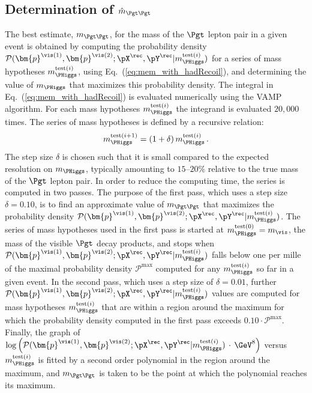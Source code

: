 \subsection{Determination of $\hat{m}_{\Pgt\Pgt}$}
\label{sec:mem_numericalMaximization}

The best estimate, $m_{\Pgt\Pgt}$, for the mass of the $\Pgt$ lepton pair in a given event
is obtained by computing the probability density $\mathcal{P}(\bm{p}^{\vis(1)},\bm{p}^{\vis(2)};\pX^{\rec},\pY^{\rec}|m_{\PHiggs}^{\textrm{test}(i)})$ 
for a series of mass hypotheses $m_{\PHiggs}^{\textrm{test}(i)}$, using Eq.~(\ref{eq:mem_with_hadRecoil}), and determining the value of $m_{\PHiggs}$ that maximizes this probability density.
The integral in Eq.~(\ref{eq:mem_with_hadRecoil}) is evaluated numerically using the VAMP algorithm.
For each mass hypotheses $m_{\PHiggs}^{\textrm{test}(i)}$ the integrand is evaluated $20,000$ times.
The series of mass hypotheses is defined by a recursive relation: 
\begin{equation}
m_{\PHiggs}^{\textrm{test}(i + 1)} = (1 + \delta) \,  m_{\PHiggs}^{\textrm{test}(i)} \, .
\label{eq:mTauTau_step_size}
\end{equation}
The step size $\delta$ is chosen such that it is small compared to the
expected resolution on $m_{\PHiggs}$,
typically amounting to $15$--$20\%$ relative to the true mass of the $\Pgt$ lepton pair.
In order to reduce the computing time, the series is computed in two passes.
The purpose of the first pass, which uses a step size $\delta = 0.10$, is to find an approximate value of $m_{\Pgt\Pgt}$
that maximizes the probability density $\mathcal{P}(\bm{p}^{\vis(1)},\bm{p}^{\vis(2)};\pX^{\rec},\pY^{\rec}|m_{\PHiggs}^{\textrm{test}(i)})$.
The series of mass hypotheses used in the first pass is started at $m_{\PHiggs}^{\textrm{test}(0)} = m_{\vis}$,
the mass of the visible $\Pgt$ decay products, 
and stops when $\mathcal{P}(\bm{p}^{\vis(1)},\bm{p}^{\vis(2)};\pX^{\rec},\pY^{\rec}|m_{\PHiggs}^{\textrm{test}(i)})$ falls below one per mille 
of the maximal probability density $\mathcal{P}^{\textrm{max}}$
computed for any $m_{\PHiggs}^{\textrm{test}(i)}$ so far in a given event.
In the second pass, which uses a step size of $\delta = 0.01$,
further $\mathcal{P}(\bm{p}^{\vis(1)},\bm{p}^{\vis(2)};\pX^{\rec},\pY^{\rec}|m_{\PHiggs}^{\textrm{test}(i)})$ values 
are computed for mass hypotheses $m_{\PHiggs}^{\textrm{test}(i)}$ that
are within a region around the maximum
for which the probability density computed in the first pass exceeds
$0.10 \cdot \mathcal{P}^{\textrm{max}}$.
Finally, the graph of $\log \left( \mathcal{P}(\bm{p}^{\vis(1)},\bm{p}^{\vis(2)};\pX^{\rec},\pY^{\rec}|m_{\PHiggs}^{\textrm{test}(i)}) \, \cdot \, \mbox{\GeV}^{8} \right)$ 
versus $m_{\PHiggs}^{\textrm{test}(i)}$ is fitted by a second order polynomial
in the region around the maximum,
and $m_{\Pgt\Pgt}$ is taken to be the point at which the polynomial reaches its maximum.
